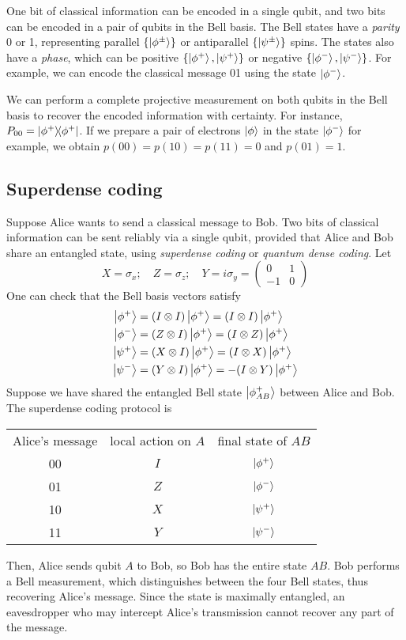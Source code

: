 One bit of classical information can be encoded in a single qubit, and two bits can be encoded in a pair of qubits in the Bell basis.
The Bell states have a \emph{parity} 0 or 1, representing parallel \( \qty{\ket{\phi^\pm}} \) or antiparallel \( \qty{\ket{\psi^\pm}} \) spins.
The states also have a \emph{phase}, which can be positive \( \qty{\ket{\phi^+}, \ket{\psi^+}} \) or negative \( \qty{\ket{\phi^-}, \ket{\psi^-}} \).
For example, we can encode the classical message 01 using the state \( \ket{\phi^-} \).

We can perform a complete projective measurement on both qubits in the Bell basis to recover the encoded information with certainty.
For instance, \( P_{00} = \op{\phi^+}{\phi^+} \).
If we prepare a pair of electrons \( \ket{\phi} \) in the state \( \ket{\phi^-} \) for example, we obtain \( p(00) = p(10) = p(11) = 0 \) and \( p(01) = 1 \).

\subsection{Superdense coding}
Suppose Alice wants to send a classical message to Bob.
Two bits of classical information can be sent reliably via a single qubit, provided that Alice and Bob share an entangled state, using \emph{superdense coding} or \emph{quantum dense coding}.
Let
\[ X = \sigma_x;\quad Z = \sigma_z;\quad Y = i\sigma_y = \begin{pmatrix}
    0 & 1 \\
    -1 & 0
\end{pmatrix} \]
One can check that the Bell basis vectors satisfy
\begin{align*}
    \ket{\phi^+} &= (I \otimes I) \ket{\phi^+} = (I \otimes I) \ket{\phi^+}\\
    \ket{\phi^-} &= (Z \otimes I) \ket{\phi^+} = (I \otimes Z) \ket{\phi^+}\\
    \ket{\psi^+} &= (X \otimes I) \ket{\phi^+} = (I \otimes X) \ket{\phi^+}\\
    \ket{\psi^-} &= (Y \otimes I) \ket{\phi^+} = -(I \otimes Y) \ket{\phi^+}
\end{align*}
Suppose we have shared the entangled Bell state \( \ket{\phi^+_{AB}} \) between Alice and Bob.
The superdense coding protocol is
\begin{center}
    \begin{tabular}{c c c}
        Alice's message & local action on \( A \) & final state of \( AB \) \\
        00 & \( I \) & \( \ket{\phi^+} \) \\
        01 & \( Z \) & \( \ket{\phi^-} \) \\
        10 & \( X \) & \( \ket{\psi^+} \) \\
        11 & \( Y \) & \( \ket{\psi^-} \)
    \end{tabular}
\end{center}
Then, Alice sends qubit \( A \) to Bob, so Bob has the entire state \( AB \).
Bob performs a Bell measurement, which distinguishes between the four Bell states, thus recovering Alice's message.
Since the state is maximally entangled, an eavesdropper who may intercept Alice's transmission cannot recover any part of the message.

